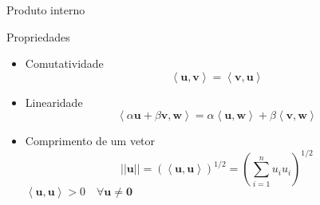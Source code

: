       \begin{slide}[toc=]{Produto interno}
	      \begin{itemize}
			      {
		       \item Propriedades
			       \begin{itemize}
				       \item Comutatividade
					       \begin{equation*}
						       \left < \mathbf u, \mathbf v \right > = \left < \mathbf v, \mathbf u \right >
					       \end{equation*}
				       \item Linearidade
					       \begin{equation*}
						       \left < \alpha\mathbf u+\beta\mathbf v, \mathbf w\right > = \alpha\left <\mathbf u, \mathbf w\right> + \beta \left <\mathbf v, \mathbf w\right >
					       \end{equation*}
				       \item Comprimento de um vetor
					       \begin{equation*}
						       ||\mathbf u||= \left (\left< \mathbf u, \mathbf u\right >\right )^{1/2} = \left (\sum_{i=1}^n u_i u_i\right )^{1/2}
					       \end{equation*}
					       $\left < \mathbf u, \mathbf u\right > > 0\quad \forall \mathbf u \neq \mathbf 0$
			       \end{itemize}
			      }
            \end{itemize}
      \end{slide}

